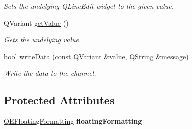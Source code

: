 \begin{DoxyCompactItemize}
\begin{DoxyCompactList}\small\item\em Sets the undelying QLineEdit widget to the given value. \end{DoxyCompactList}\item 
\hypertarget{classQENumericEdit_a44bcfb114dd2c89a87036c8df3899670}{
QVariant \hyperlink{classQENumericEdit_a44bcfb114dd2c89a87036c8df3899670}{getValue} ()}
\label{classQENumericEdit_a44bcfb114dd2c89a87036c8df3899670}

\begin{DoxyCompactList}\small\item\em Gets the undelying value. \end{DoxyCompactList}\item 
\hypertarget{classQENumericEdit_afb4f057c21fe65c691dcb6df5d310ea2}{
bool \hyperlink{classQENumericEdit_afb4f057c21fe65c691dcb6df5d310ea2}{writeData} (const QVariant \&value, QString \&message)}
\label{classQENumericEdit_afb4f057c21fe65c691dcb6df5d310ea2}

\begin{DoxyCompactList}\small\item\em Write the data to the channel. \end{DoxyCompactList}\end{DoxyCompactItemize}
\subsection*{Protected Attributes}
\begin{DoxyCompactItemize}
\item 
\hypertarget{classQENumericEdit_abdd391649029bf0eecb9a382bb43fdec}{
\hyperlink{classQEFloatingFormatting}{QEFloatingFormatting} {\bfseries floatingFormatting}}
\label{classQENumericEdit_abdd391649029bf0eecb9a382bb43fdec}

\end{DoxyCompactItemize}
